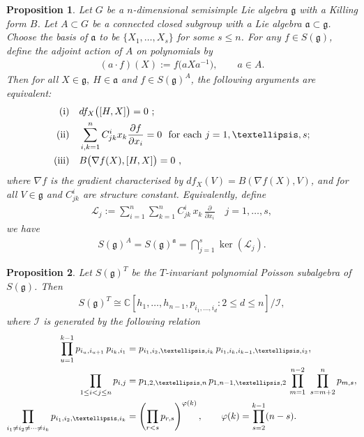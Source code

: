 \documentclass[10pt,a4paper]{amsart}
\newtheorem{proposition}{Proposition}
\begin{document}
\begin{proposition}
\label{prop:equ}
Let $G$ be a $n$-dimensional semisimple Lie algebra $\mathfrak{g}$ with a Killing form $B$. %
 Let $A\subset G$ be a connected closed subgroup with a Lie algebra $\mathfrak{a}\subset\mathfrak{g}$. Choose the basis of $\mathfrak{a}$ to be $\{X_1,\dots,X_s\}$ for some $s\leq n$. For any $f\in S(\mathfrak{g})$, define the adjoint action of $A$ on polynomials by
\begin{align*}
(a \cdot  f)(X):=f\big(aXa^{-1}\big),\qquad a\in A .
\end{align*}
Then for all $X\in\mathfrak{g},\ H\in\mathfrak{a}$ and $f \in S(\mathfrak{g})^A$, the following arguments are equivalent:
\begin{align*}
\text{\emph{(i)}}\quad & df_X \big([H,X]\big)=0\ ;\\
\text{\emph{(ii)}}\quad &
\sum_{i,k=1}^n  C_{jk}^i x_k \frac{\partial f}{\partial x_i} =0
\ \ \text{for each }j=1,\dots,s;\\
\text{\emph{(iii)}}\quad & B \big(\nabla f(X),[H,X]\big)=0\ ,
\end{align*} where $\nabla f$ is the gradient characterised by $df_X(V)=B(\nabla f(X),V)$, and for all $V\in\mathfrak{g}$ and $C_{jk}^i$ are structure constant. Equivalently, define
\begin{align*}
\mathcal{L}_j:=\sum_{i=1}^n\sum_{k=1}^n C_{jk}^i\,x_k\,\frac{\partial}{\partial x_i}\quad  j=1,\dots,s ,
\end{align*} we have \begin{align}
S(\mathfrak{g})^A=S(\mathfrak{g})^{\mathfrak{a}}=\bigcap_{j=1}^s \ker(\mathcal{L}_j). \label{eq:pdefin}
\end{align}
\end{proposition}

\begin{proposition}
    Let $S(\mathfrak{g})^T$ be the $T$-invariant polynomial Poisson subalgebra of $S(\mathfrak{g})$. Then \begin{align*}
        S(\mathfrak{g})^T \cong \mathbb{C}[h_1,\ldots,h_{n-1},p_{i_1,\ldots,i_d} : 2 \leq d \leq n] \big/ \mathcal{I} ,
\end{align*} where $\mathcal{I}$ is generated by the following relation \begin{align*}
    \prod_{u=1}^{k-1} p_{i_u,i_{u+1}}\, p_{i_k,i_1}
 &= p_{i_1,i_2,\ldots,i_k}\, p_{i_1,i_k,i_{k-1},\ldots,i_2},
 \notag\\
 \prod_{1 \leq i < j \leq n} p_{i,j}
 &= p_{1,2,\ldots,n}\, p_{1,n-1,\ldots,2}\,
 \prod_{m=1}^{n-2}\ \prod_{s=m+2}^{n} p_{m,s},
 \notag\\
 \prod_{i_1 \neq i_2 \neq \cdots \neq i_k} p_{i_1,i_2,\ldots,i_k}
 &= \left(\prod_{r<s} p_{r,s}\right)^{\varphi(k)},
 \qquad
 \varphi(k)=\prod_{s=2}^{k-1}(n-s). 
\end{align*}
\end{proposition}
\end{document}
